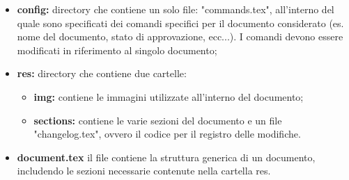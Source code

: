        \begin{itemize}
          \item \textbf{config:} directory che contiene un solo file: "commands.tex", all'interno del quale sono specificati dei comandi specifici per il documento considerato (es. nome del documento, stato di approvazione, ecc...). I comandi devono essere modificati in riferimento al singolo documento;
          \item \textbf{res:} directory che contiene due cartelle:
            \begin{itemize}
              \item \textbf{img:} contiene le immagini utilizzate all'interno del documento;
              \item \textbf{sections:} contiene le varie sezioni del documento e un file "changelog.tex", ovvero il codice per il registro delle modifiche.
            \end{itemize}
          \item \textbf{document.tex} il file contiene la struttura generica di un documento, includendo le sezioni necessarie contenute nella cartella res.
        \end{itemize}

